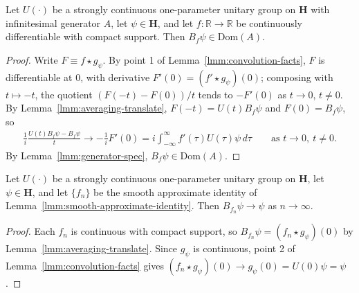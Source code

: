 \begin{lemma}
    \label{lmm:averaging-in-generator-domain}
    \leanok
    Let $U(\cdot)$ be a strongly continuous one-parameter unitary group on $\mathbf{H}$ with infinitesimal generator $A$, let $\psi \in \mathbf{H}$, and let $f : \mathbb{R} \rightarrow \mathbb{R}$ be continuously differentiable with compact support. Then $B_f\psi \in \text{Dom}(A)$.
\end{lemma}
\begin{proof}
    \leanok
Write $F \equiv f \star g_\psi$. By point 1 of Lemma~\ref{lmm:convolution-facts}, $F$ is differentiable at $0$, with derivative $F'(0) = (f' \star g_\psi)(0)$; composing with $t \mapsto -t$, the quotient $\left( F(-t) - F(0) \right)/t$ tends to $-F'(0)$ as $t \to 0$, $t \ne 0$. By Lemma~\ref{lmm:averaging-translate}, $F(-t) = U(t)B_f\psi$ and $F(0) = B_f\psi$, so
\begin{align}
    \frac{1}{i}\frac{U(t)B_f\psi - B_f\psi}{t} \longrightarrow -\frac{1}{i}F'(0) = i\int_{-\infty}^{\infty} f'(\tau)U(\tau)\psi \, d\tau \qquad \text{as } t \rightarrow 0,\ t \ne 0.
\end{align}
By Lemma~\ref{lmm:generator-spec}, $B_f\psi \in \text{Dom}(A)$.
\end{proof}

\begin{lemma}
    \label{lmm:averaging-approximates}
    \leanok
    Let $U(\cdot)$ be a strongly continuous one-parameter unitary group on $\mathbf{H}$, let $\psi \in \mathbf{H}$, and let $\{f_n\}$ be the smooth approximate identity of Lemma~\ref{lmm:smooth-approximate-identity}. Then $B_{f_n}\psi \to \psi$ as $n \to \infty$.
\end{lemma}
\begin{proof}
    \leanok
Each $f_n$ is continuous with compact support, so $B_{f_n}\psi = (f_n \star g_\psi)(0)$ by Lemma~\ref{lmm:averaging-translate}. Since $g_\psi$ is continuous, point 2 of Lemma~\ref{lmm:convolution-facts} gives $(f_n \star g_\psi)(0) \to g_\psi(0) = U(0)\psi = \psi$.
\end{proof}

